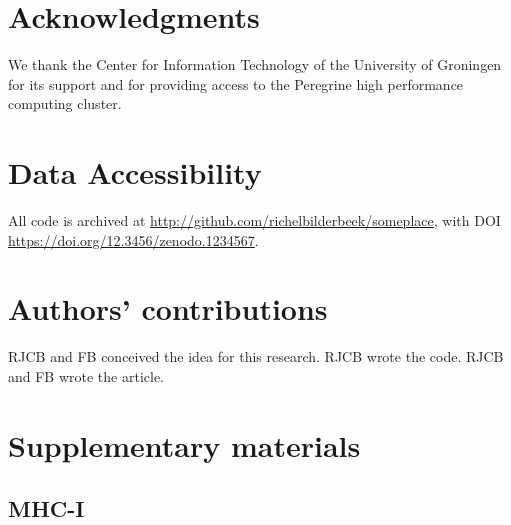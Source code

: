 \documentclass{article}
\begin{document}
\section{Acknowledgments}

We thank the Center for Information Technology of the University 
of Groningen for its support and for providing access to the Peregrine 
high performance computing cluster. 

\section{Data Accessibility}

All code is archived at \url{http://github.com/richelbilderbeek/someplace},
with DOI \url{https://doi.org/12.3456/zenodo.1234567}.

\section{Authors' contributions}

RJCB and FB conceived the idea for this research. 
RJCB wrote the code.
RJCB and FB wrote the article.





\appendix
\section{Supplementary materials}

\subsection{MHC-I}
\end{document}
